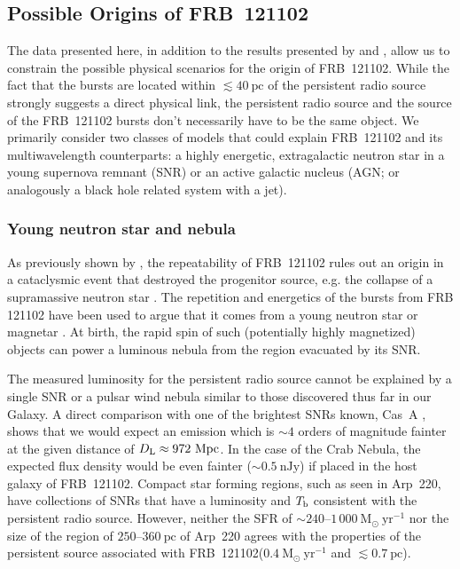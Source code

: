 \documentclass[twocolumn]{aastex61}
\newcommand{\frb}{FRB~121102\xspace}
\newcommand{\msun}{\mathrm{M_{\odot}}\xspace}
\begin{document}
\subsection{Possible Origins of \frb}

The data presented here, in addition to the results presented by \citet{chatterjee2017} and \citet{tendulkar2017}, allow us to constrain the possible physical scenarios for the origin of \frb.  While the fact that the bursts are located within $\lesssim 40~\mathrm{pc}$ of the persistent radio source strongly suggests a direct physical link, the persistent radio source and the source of the \frb bursts don't necessarily have to be the same object.  We primarily consider two classes of models that could explain \frb and its multiwavelength counterparts: a highly energetic, extragalactic neutron star in a young supernova remnant (SNR) or an active galactic nucleus (AGN; or analogously a black hole related system with a jet).

\subsubsection{Young neutron star and nebula}

As previously shown by \citet{ssh+16a}, the repeatability of \frb rules out an origin in a cataclysmic event that destroyed the progenitor source, e.g. the collapse of a supramassive neutron star \citep{fr14}.  The repetition and energetics of the bursts from FRB 121102 have been used to argue that it comes from a young neutron star or magnetar \citep{cw16,lbp16,pp16}. At birth, the rapid spin of such (potentially highly magnetized) objects can power a luminous nebula from the region evacuated by its SNR.

The measured luminosity for the persistent radio source cannot be explained by a single SNR or a pulsar wind nebula similar to those discovered thus far in our Galaxy. A direct comparison with one of the brightest SNRs known, Cas~A \citep[300~yr old;][]{baars1977,reed1995}, shows that we would expect an emission which is $\sim 4$ orders of magnitude fainter at the given distance of $D_{\rm L} \approx 972\ \mathrm{Mpc}$. In the case of the Crab Nebula, the expected flux density would be even fainter ($\sim 0.5~\mathrm{nJy}$) if placed in the host galaxy of \frb.  Compact star forming regions, such as seen in Arp~220, have collections of SNRs that have a luminosity and $T_{\rm b}$ consistent with the persistent radio source. However, neither the SFR of $\sim 240$--$1\,000~\msun\ \mathrm{yr^{-1}}$ nor the size of the region of $250$--$360~\mathrm{pc}$ of Arp~220 \citep{anantharamaiah2000} agrees with the properties of the persistent source associated with \frb ($0.4~\msun\ \mathrm{yr^{-1}}$ and $\lesssim 0.7~\mathrm{pc}$). 
\end{document}
